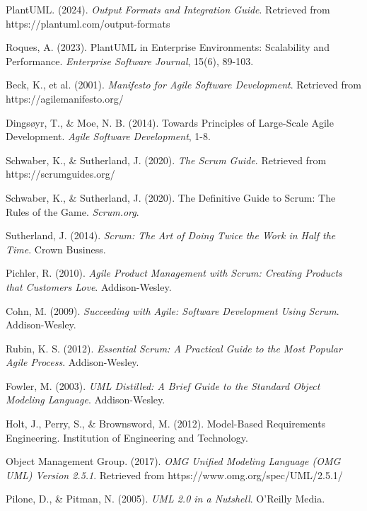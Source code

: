 \begin{thebibliography}{99}
    PlantUML. (2024). \textit{Output Formats and Integration Guide}. Retrieved from https://plantuml.com/output-formats
    
    Roques, A. (2023). PlantUML in Enterprise Environments: Scalability and Performance. \textit{Enterprise Software Journal}, 15(6), 89-103.
    
    Beck, K., et al. (2001). \textit{Manifesto for Agile Software Development}. Retrieved from https://agilemanifesto.org/
    
    Dingsøyr, T., \& Moe, N. B. (2014). Towards Principles of Large-Scale Agile Development. \textit{Agile Software Development}, 1-8.
    
    Schwaber, K., \& Sutherland, J. (2020). \textit{The Scrum Guide}. Retrieved from https://scrumguides.org/
    
    Schwaber, K., \& Sutherland, J. (2020). The Definitive Guide to Scrum: The Rules of the Game. \textit{Scrum.org}.
    
    Sutherland, J. (2014). \textit{Scrum: The Art of Doing Twice the Work in Half the Time}. Crown Business.
    
    Pichler, R. (2010). \textit{Agile Product Management with Scrum: Creating Products that Customers Love}. Addison-Wesley.
    
    Cohn, M. (2009). \textit{Succeeding with Agile: Software Development Using Scrum}. Addison-Wesley.
    
    Rubin, K. S. (2012). \textit{Essential Scrum: A Practical Guide to the Most Popular Agile Process}. Addison-Wesley.
    
    Fowler, M. (2003). \textit{UML Distilled: A Brief Guide to the Standard Object Modeling Language}. Addison-Wesley.
    
    Holt, J., Perry, S., \& Brownsword, M. (2012). Model-Based Requirements Engineering. Institution of Engineering and Technology.
    
    Object Management Group. (2017). \textit{OMG Unified Modeling Language (OMG UML) Version 2.5.1}. Retrieved from https://www.omg.org/spec/UML/2.5.1/
    
    Pilone, D., \& Pitman, N. (2005). \textit{UML 2.0 in a Nutshell}. O'Reilly Media.
    
    \end{thebibliography}